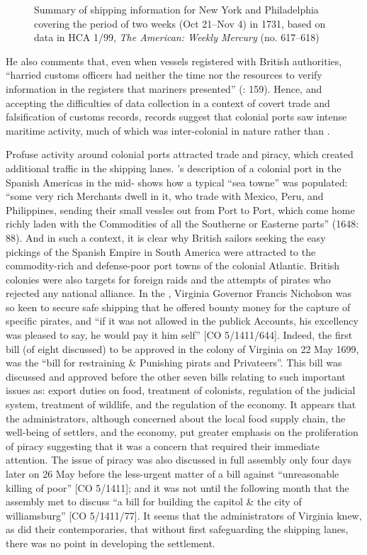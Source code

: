 \begin{figure}
\caption{\label{tab:key:4.3} Summary of shipping information for New York and Philadelphia covering the period of two weeks (Oct 21–Nov 4) in 1731, based on data in HCA 1/99, \textit{The American: Weekly Mercury} (no. 617–618)}
\end{figure}
 

He also comments that, even when vessels registered with British authorities, “harried customs officers had neither the time nor the resources to verify information in the registers that mariners presented” (\citealt{Jarvis2010}: 159). Hence, and accepting the difficulties of data collection in a context of covert trade and falsification of customs records, records suggest that colonial ports saw intense maritime activity, much of which was inter-colonial in nature rather than . 

Profuse activity around colonial ports attracted  trade and piracy, which created additional traffic in the shipping lanes. \citeauthor{Gage1648}’s description of a colonial port in the Spanish Americas in the mid- shows how a typical “sea towne” was populated: “some very rich Merchants dwell in it, who trade with Mexico, Peru, and Philippines, sending their small vessles out from Port to Port, which come home richly laden with the Commodities of all the Southerne or Easterne parts” (1648: 88). And in such a context, it is clear why British sailors seeking the easy pickings of the Spanish Empire in South America were attracted to the commodity-rich and defense-poor port towns of the colonial Atlantic. British colonies were also targets for foreign raids and the attempts of pirates who rejected any national alliance. In the , Virginia Governor Francis Nicholson was so keen to secure safe shipping that he offered bounty money for the capture of specific pirates, and “if it was not allowed in the publick Accounts, his excellency was pleased to say, he would pay it him self” [CO 5/1411/644].  Indeed, the first bill (of eight discussed) to be approved in the colony of Virginia on 22 May {1699}, was the “bill for restraining \& Punishing pirats and Privateers”. This bill was discussed and approved before the other seven bills relating to such important issues as: export duties on food, treatment of colonists, regulation of the judicial system, treatment of wildlife, and the regulation of the economy. It appears that the administrators, although concerned about the local food supply chain, the well-being of settlers, and the economy, put greater emphasis on the proliferation of piracy
suggesting that it was a concern that required their immediate attention. The issue of piracy was also discussed in full assembly only four days later on 26 May before the less-urgent matter of a bill against “unreasonable killing of poor” [CO 5/1411]; and it was not until the following month that the assembly met to discuss “a bill for building the capitol \& the city of williamsburg” [CO 5/1411/77]. It seems that  the administrators of Virginia knew, as did their contemporaries, that without first safeguarding the shipping lanes, there was no point in developing the settlement. 

